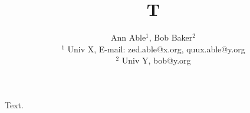 \documentclass{article}
\begin{document}
\title{T}
\author{Ann Able$^1$, Bob Baker$^2$ \\
$^1$ Univ X, E-mail: zed.able@x.org, quux.able@y.org \\
$^2$ Univ Y, bob@y.org}
\maketitle
Text.
\end{document}
